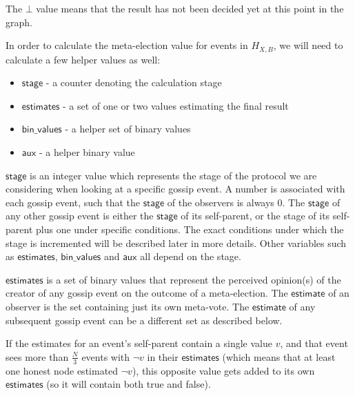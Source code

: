 \documentclass[a4paper,fleqn]{article}
\begin{document}
The $\bot$ value means that the result has not been decided yet at this point in the graph.

In order to calculate the meta-election value for events in $H_{X,B}$, we will need to calculate a
few helper values as well:

\begin{itemize}
	\item $\mathsf{stage}$ - a counter denoting the calculation stage
	\item $\mathsf{estimates}$ - a set of one or two values estimating the final result
	\item $\mathsf{bin\_values}$ - a helper set of binary values
	\item $\mathsf{aux}$ - a helper binary value
\end{itemize}

$\mathsf{stage}$ is an integer value which represents the stage of the protocol we are considering
when looking at a specific gossip event. A number is associated with each gossip event, such that
the $\mathsf{stage}$ of the observers is always 0. The $\mathsf{stage}$ of any other gossip event
is either the $\mathsf{stage}$ of its self-parent, or the stage of its self-parent plus one under 
specific conditions. The exact conditions under which the stage is incremented will be described
later in more details. Other variables such as $\mathsf{estimates}$, $\mathsf{bin\_values}$ and
$\mathsf{aux}$ all depend on the stage.

$\mathsf{estimates}$ is a set of binary values that represent the perceived opinion(s) of the
creator of any gossip event on the outcome of a meta-election. The $\mathsf{estimate}$ of an
observer is the set containing just its own meta-vote. The $\mathsf{estimate}$ of any subsequent
gossip event can be a different set as described below.

If the estimates for an event's self-parent contain a single value $v$, and that event sees more 
than $\frac{N}{3}$ events with $\neg v$ in their $\mathsf{estimates}$ (which means that at least
one honest node estimated $\neg v$), this opposite value gets added to its own $\mathsf{estimates}$
(so it will contain both true and false).
\end{document}
